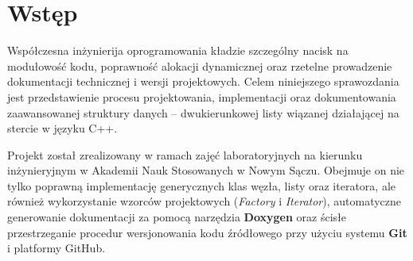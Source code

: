 \section*{Wstęp}

Współczesna inżynierija oprogramowania kładzie szczególny nacisk na modułowość kodu, poprawność alokacji dynamicznej oraz rzetelne prowadzenie dokumentacji technicznej i wersji projektowych. Celem niniejszego sprawozdania jest przedstawienie procesu projektowania, implementacji oraz dokumentowania zaawansowanej struktury danych -- dwukierunkowej listy wiązanej działającej na stercie w języku C++.

Projekt został zrealizowany w ramach zajęć laboratoryjnych na kierunku inżynieryjnym w Akademii Nauk Stosowanych w Nowym Sączu. Obejmuje on nie tylko poprawną implementację generycznych klas węzła, listy oraz iteratora, ale również wykorzystanie wzorców projektowych (\textit{Factory} i \textit{Iterator}), automatyczne generowanie dokumentacji za pomocą narzędzia \textbf{Doxygen} oraz ścisłe przestrzeganie procedur wersjonowania kodu źródłowego przy użyciu systemu \textbf{Git} i platformy GitHub.